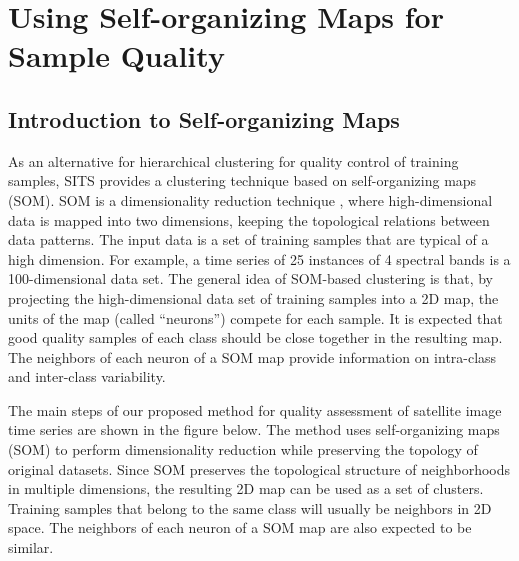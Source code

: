 \documentclass[a4paper,]{tufte-book}
\begin{document}
\hypertarget{using-self-organizing-maps-for-sample-quality}{%
\section{Using Self-organizing Maps for Sample Quality}\label{using-self-organizing-maps-for-sample-quality}}

\hypertarget{introduction-to-self-organizing-maps}{%
\subsection{Introduction to Self-organizing Maps}\label{introduction-to-self-organizing-maps}}

As an alternative for hierarchical clustering for quality control of training samples, SITS provides a clustering technique based on self-organizing maps (SOM). SOM is a dimensionality reduction technique \citep{Kohonen1990}, where high-dimensional data is mapped into two dimensions, keeping the topological relations between data patterns. The input data is a set of training samples that are typical of a high dimension. For example, a time series of 25 instances of 4 spectral bands is a 100-dimensional data set. The general idea of SOM-based clustering is that, by projecting the high-dimensional data set of training samples into a 2D map, the units of the map (called ``neurons'') compete for each sample. It is expected that good quality samples of each class should be close together in the resulting map. The neighbors of each neuron of a SOM map provide information on intra-class and inter-class variability.

The main steps of our proposed method for quality assessment of satellite image time series are shown in the figure below. The method uses self-organizing maps (SOM) to perform dimensionality reduction while preserving the topology of original datasets. Since SOM preserves the topological structure of neighborhoods in multiple dimensions, the resulting 2D map can be used as a set of clusters. Training samples that belong to the same class will usually be neighbors in 2D space. The neighbors of each neuron of a SOM map are also expected to be similar.
\end{document}
